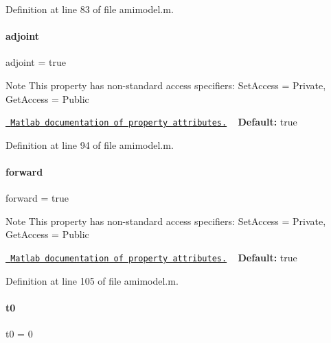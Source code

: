 Definition at line 83 of file amimodel.\+m.

\mbox{\label{classamimodel_ab6d500b41cf50693452415caca31d32e}} 
\paragraph{\texorpdfstring{adjoint}{adjoint}}
{\footnotesize\ttfamily adjoint = true}

\begin{DoxyNote}{Note}
This property has non-\/standard access specifiers\+: {\ttfamily Set\+Access = Private, Get\+Access = Public} 

\href{http://www.mathworks.com/help/matlab/matlab_oop/property-attributes.html}{\texttt{ Matlab documentation of property attributes.}} ~\newline
{\bfseries{Default\+:}} true 
\end{DoxyNote}


Definition at line 94 of file amimodel.\+m.

\mbox{\label{classamimodel_a81e42e48c9c72814166c8f7cd414ce24}} 
\paragraph{\texorpdfstring{forward}{forward}}
{\footnotesize\ttfamily forward = true}

\begin{DoxyNote}{Note}
This property has non-\/standard access specifiers\+: {\ttfamily Set\+Access = Private, Get\+Access = Public} 

\href{http://www.mathworks.com/help/matlab/matlab_oop/property-attributes.html}{\texttt{ Matlab documentation of property attributes.}} ~\newline
{\bfseries{Default\+:}} true 
\end{DoxyNote}


Definition at line 105 of file amimodel.\+m.

\mbox{\label{classamimodel_abdb5a42ffee3ca622484b53a322f1004}} 
\paragraph{\texorpdfstring{t0}{t0}}
{\footnotesize\ttfamily t0 = 0}

